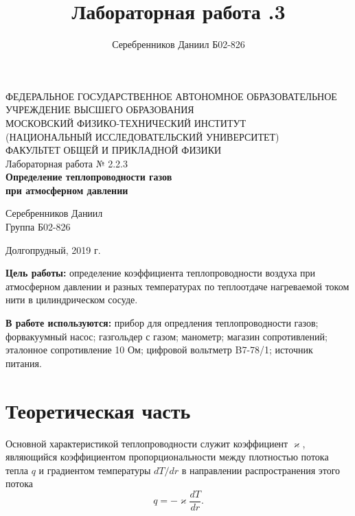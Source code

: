 \documentclass[a4paper,12pt]{article} %
\author{Серебренников Даниил Б02-826}
\title{Лабораторная работа \No 2.2.3}
\begin{document}
\begin{center}
\footnotesize{ФЕДЕРАЛЬНОЕ ГОСУДАРСТВЕННОЕ АВТОНОМНОЕ ОБРАЗОВАТЕЛЬНОЕ 			УЧРЕЖДЕНИЕ ВЫСШЕГО ОБРАЗОВАНИЯ}\\
\footnotesize{МОСКОВСКИЙ ФИЗИКО-ТЕХНИЧЕСКИЙ ИНСТИТУТ\\(НАЦИОНАЛЬНЫЙ 			ИССЛЕДОВАТЕЛЬСКИЙ УНИВЕРСИТЕТ)}\\
\footnotesize{ФАКУЛЬТЕТ ОБЩЕЙ И ПРИКЛАДНОЙ ФИЗИКИ\\}
\hfill \break
\hfill\break
\hfill\break
\hfill \break
\hfill \break
\hfill \break
\hfill \break
\hfill \break
\hfill \break
\hfill \break
\hfill \break
\hfill \break
\hfill \break
\hfill \break
\hfill \break
\large{Лабораторная работа № 2.2.3\\\textbf{Определение теплопроводности газов	\\при атмосферном давлении}}\\
\hfill \break
\hfill \break
\hfill \break
\begin{flushright}
	Серебренников Даниил\\
	Группа Б02-826
\end{flushright}
\hfill \break
\hfill \break
\hfill \break
\hfill \break
\hfill \break
\end{center}
\hfill \break
\hfill \break
\hfill \break
\hfill \break
\hfill \break
\begin{center}
	Долгопрудный, 2019 г.
\end{center}
\thispagestyle{empty} %


\newpage
\textbf{Цель работы:} определение коэффициента теплопроводности воздуха при атмосферном давлении и разных температурах по теплоотдаче нагреваемой током нити в цилиндрическом сосуде.

\textbf{В работе используются:} прибор для опредления теплопроводности газов; форвакуумный насос; газгольдер с газом; манометр; магазин сопротивлений; эталонное сопротивление 10 Ом; цифровой вольтметр B7-78/1; источник питания.


\section{Теоретическая часть}

	Основной характеристикой теплопроводности служит коэффициент $\varkappa$, являющийся коэффициентом пропорциональности между плотностью потока тепла $q$ и градиентом температуры $dT/dr$ в направлении распространения этого потока
\begin{equation}
	q = -\varkappa \frac{dT}{dr}.
\end{equation}
\end{document}
